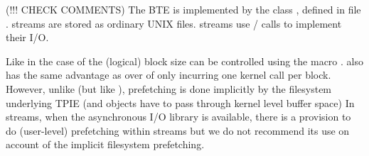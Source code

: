 (!!! CHECK COMMENTS) 
The  BTE is implemented by the class
, defined in file
.  
streams are stored as ordinary UNIX files.
 streams use
/ calls to implement their
I/O.




Like in the case of  the
(logical) block size can be controlled using the macro
.
 also has the same advantage as
 over  of only incurring
one kernel call per block. However, unlike 
(but like ), prefetching is done
implicitly by the filesystem underlying TPIE (and objects
have to pass through kernel level buffer space)
In  streams, when the asynchronous I/O library
 is available,
there is a provision to do (user-level) prefetching within 
streams but we do not recommend its use on account of the implicit
filesystem prefetching.

